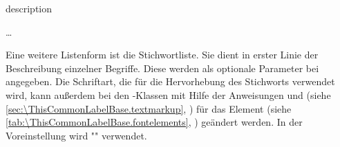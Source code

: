   \begin{Declaration}
    \begin{Environment}{description}
      \begin{Body}
         \dots
        \BodyDots
      \end{Body}
    \end{Environment}
  \end{Declaration}%
  Eine weitere
  Listenform ist die Stichwortliste. Sie dient in
  erster Linie der Beschreibung einzelner Begriffe. Diese werden als optionale
  Parameter bei  angegeben. %
  Die Schriftart, die für die Hervorhebung des
  Stichworts verwendet wird, kann außerdem bei den \KOMAScript-Klassen mit
  Hilfe der Anweisungen  und
   (siehe
  \autoref{sec:\ThisCommonLabelBase.textmarkup},
  ) für das Element
  (siehe \autoref{tab:\ThisCommonLabelBase.fontelements},
  ) geändert werden. In der
  Voreinstellung wird "" verwendet.%
